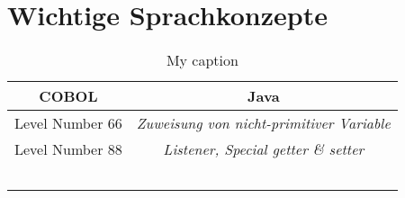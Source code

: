 \section{Wichtige Sprachkonzepte}

\begin{table}[H]
\centering
\begin{tabularx}{\textwidth}{|C|C|}
\hline
\textbf{\large{COBOL}} & \textbf{\large{Java}} \\\hline
Level Number 66 & \textit{Zuweisung von nicht-primitiver Variable} \\\hline
Level Number 88 & \textit{Listener, Special getter \& setter} \\\hline
& \\\hline
& \\\hline
& \\\hline
& \\\hline
& \\\hline
\end{tabularx}
\caption{My caption}
\label{my-label}
\end{table}